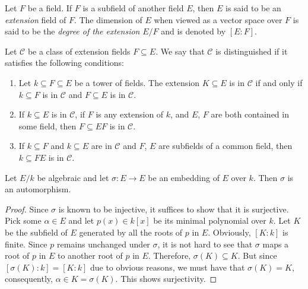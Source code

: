 \begin{definition}
    Let $F$ be a field. If $F$ is a subfield of another field $E$, then $E$ is said to be an \textit{extension} field of $F$. The dimension of $E$ when viewed as a vector space over $F$ is said to be the \textit{degree of the extension} $E/F$ and is denoted by $[E:F]$.
\end{definition}

\begin{definition}
    
\end{definition}


\begin{definition}
    Let $\mathscr{C}$ be a class of extension fields $F\subseteq E$. We say that $\mathscr{C}$ is distinguished if it satisfies the following conditions: 
    \begin{enumerate}
        \item Let $k\subseteq F\subseteq E$ be a tower of fields. The extension $K\subseteq E$ is in $\mathscr{C}$ if and only if $k\subseteq F$ is in $\mathscr{C}$ and $F\subseteq E$ is in $\mathscr{C}$.

        \item If $k\subseteq E$ is in $\mathscr{C}$, if $F$ is any extension of $k$, and $E$, $F$ are both contained in some field, then $F\subseteq EF$ is in $\mathscr{C}$.

        \item If $k\subseteq F$ and $k\subseteq E$ are in $\mathscr{C}$ and $F$, $E$ are subfields of a common field, then $k\subseteq FE$ is in $\mathscr{C}$.
    \end{enumerate}
\end{definition}

\begin{lemma}
    Let $E/k$ be algebraic and let $\sigma: E\to E$ be an embedding of $E$ over $k$. Then $\sigma$ is an automorphism.
\end{lemma}
\begin{proof}
    Since $\sigma$ is known to be injective, it suffices to show that it is surjective. Pick some $\alpha\in E$ and let $p(x)\in k[x]$ be its minimal polynomial over $k$. Let $K$ be the subfield of $E$ generated by all the roots of $p$ in $E$. Obviously, $[K:k]$ is finite. Since $p$ remains unchanged under $\sigma$, it is not hard to see that $\sigma$ maps a root of $p$ in $E$ to another root of $p$ in $E$. Therefore, $\sigma(K)\subseteq K$. But since $[\sigma(K):k] = [K:k]$ due to obvious reasons, we must have that $\sigma(K) = K$, consequently, $\alpha\in K = \sigma(K)$. This shows surjectivity.
\end{proof}